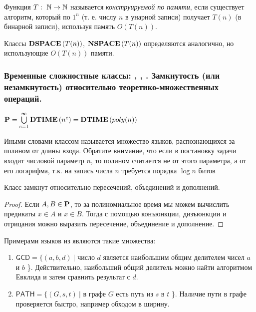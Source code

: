 \begin{definition}
Функция $T :\ \mathbb{N} \to \mathbb{N}$
называется \textit{конструируемой по памяти}, если существует алгоритм, который
по $1^n$ (т. е. числу $n$ в унарной записи) получает $T(n)$ (в бинарной записи), используя память $O(T(n))$.
\end{definition}

\begin{definition} Классы $\textbf{DSPACE}\left({T(n)}\right)$, $\textbf{NSPACE}\left({T(n)}\right)$ определяются аналогично, но использующие $O(T(n))$ памяти.
\end{definition}

\subsubsection{Временные сложностные классы: \p, \e, \EXP. Замкнутость (или незамкнутость) \p относительно теоретико-множественных
операций.}
\begin{definition} $\textbf{P} = \bigcup\limits_{c=1}^{\infty}\textbf{DTIME}\left({n^c}\right) = \textbf{DTIME}\left({poly(n)}\right)$

Иными словами классом \p называется множество языков, распознающихся за полином от длины входа. Обратите внимание, что если в постановку задачи входит числовой параметр
$n$, то полином считается не от этого параметра, а от его логарифма, т.к.
на запись числа $n$ требуется порядка $\log n$ битов
\end{definition}

\begin{note}
Класс \p замкнут относительно пересечений, объединений и дополнений.
\end{note}

\begin{proof}
Если $A, B \in \textbf{P}$, то за полиномиальное время мы можем вычислить предикаты $x \in A$ и $x \in B$. Тогда с помощью конъюнкции, дизъюнкции и отрицания можно выразить пересечение, объединение и дополнение.
\end{proof}

\begin{example} Примерами языков из
\p являются такие множества:

\begin{enumerate}
    \item $ \mathsf{GCD} = \{(a,b,d) \ | $ число $d$ является наибольшим общим делителем чисел $a$ и $b$ \}.  Действительно, наибольший общий делитель можно найти алгоритмом Евклида и затем сравнить результат с $d$.
    \item $ \mathsf{PATH} = \{(G,s,t) \ | $ в графе $G$ есть путь из $s$ в $t$ \}. Наличие пути в графе проверяется быстро, например обходом в ширину.
\end{enumerate}
\end{example}

